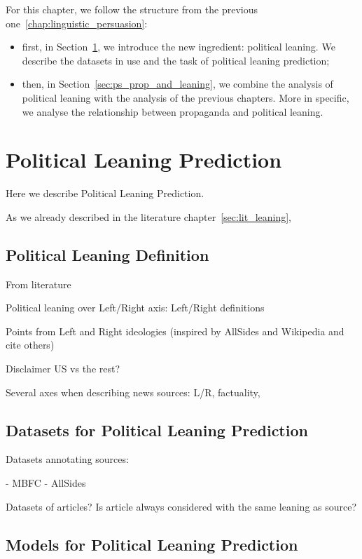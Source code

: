 For this chapter, we follow the structure from the previous one~\ref{chap:linguistic_persuasion}:
\begin{itemize}
    \item first, in Section~\ref{sec:ps_political_sides}, we introduce the new ingredient: political leaning. We describe the datasets in use and the task of political leaning prediction;
    \item then, in Section~\ref{sec:ps_prop_and_leaning}, we combine the analysis of political leaning with the analysis of the previous chapters. More in specific, we analyse the relationship between propaganda and political leaning.
\end{itemize}


\section{\statusred Political Leaning Prediction}
\label{sec:ps_political_sides}

Here we describe Political Leaning Prediction.

As we already described in the literature chapter~\ref{sec:lit_leaning}, 

\subsection{Political Leaning Definition}

From literature

Political leaning over Left/Right axis: Left/Right definitions

Points from Left and Right ideologies (inspired by AllSides and Wikipedia and cite others) 

Disclaimer US vs the rest?

Several axes when describing news sources: L/R, factuality, 

\subsection{Datasets for Political Leaning Prediction}

Datasets annotating sources:

- MBFC
- AllSides

Datasets of articles? Is article always considered with the same leaning as source?

\subsection{Models for Political Leaning Prediction}

